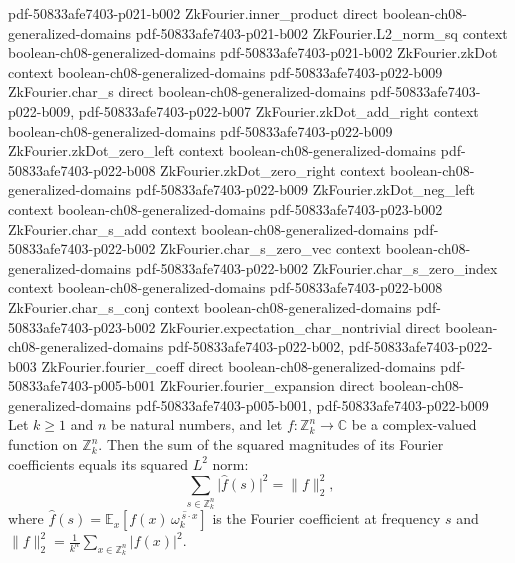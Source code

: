 \begin{lemma}
  {pdf-50833afe7403-p021-b002}
\proofstep
  {ZkFourier.inner_product}
  {direct}
  {boolean-ch08-generalized-domains}
  {pdf-50833afe7403-p021-b002}
\proofstep
  {ZkFourier.L2_norm_sq}
  {context}
  {boolean-ch08-generalized-domains}
  {pdf-50833afe7403-p021-b002}
\proofstep
  {ZkFourier.zkDot}
  {context}
  {boolean-ch08-generalized-domains}
  {pdf-50833afe7403-p022-b009}
\proofstep
  {ZkFourier.char_s}
  {direct}
  {boolean-ch08-generalized-domains}
  {pdf-50833afe7403-p022-b009,
    pdf-50833afe7403-p022-b007}
\proofstep
  {ZkFourier.zkDot_add_right}
  {context}
  {boolean-ch08-generalized-domains}
  {pdf-50833afe7403-p022-b009}
\proofstep
  {ZkFourier.zkDot_zero_left}
  {context}
  {boolean-ch08-generalized-domains}
  {pdf-50833afe7403-p022-b008}
\proofstep
  {ZkFourier.zkDot_zero_right}
  {context}
  {boolean-ch08-generalized-domains}
  {pdf-50833afe7403-p022-b009}
\proofstep
  {ZkFourier.zkDot_neg_left}
  {context}
  {boolean-ch08-generalized-domains}
  {pdf-50833afe7403-p023-b002}
\proofstep
  {ZkFourier.char_s_add}
  {context}
  {boolean-ch08-generalized-domains}
  {pdf-50833afe7403-p022-b002}
\proofstep
  {ZkFourier.char_s_zero_vec}
  {context}
  {boolean-ch08-generalized-domains}
  {pdf-50833afe7403-p022-b002}
\proofstep
  {ZkFourier.char_s_zero_index}
  {context}
  {boolean-ch08-generalized-domains}
  {pdf-50833afe7403-p022-b008}
\proofstep
  {ZkFourier.char_s_conj}
  {context}
  {boolean-ch08-generalized-domains}
  {pdf-50833afe7403-p023-b002}
\proofstep
  {ZkFourier.expectation_char_nontrivial}
  {direct}
  {boolean-ch08-generalized-domains}
  {pdf-50833afe7403-p022-b002,
    pdf-50833afe7403-p022-b003}
\proofstep
  {ZkFourier.fourier_coeff}
  {direct}
  {boolean-ch08-generalized-domains}
  {pdf-50833afe7403-p005-b001}
\proofstep
  {ZkFourier.fourier_expansion}
  {direct}
  {boolean-ch08-generalized-domains}
  {pdf-50833afe7403-p005-b001,
    pdf-50833afe7403-p022-b009}
Let $k \ge 1$ and $n$ be natural numbers, and let $f : \mathbb{Z}_k^n \to \mathbb{C}$ be
a complex-valued function on $\mathbb{Z}_k^n$. Then the sum of the squared magnitudes of
its Fourier coefficients equals its squared $L^2$ norm:
\[
  \sum_{s \in \mathbb{Z}_k^n} \bigl|\hat{f}(s)\bigr|^2 = \|f\|_2^2,
\]
where $\hat{f}(s) = \mathbb{E}_{x}\!\left[f(x)\,\overline{\omega_k^{\,s \cdot
x}}\right]$ is the Fourier coefficient at frequency $s$ and $\|f\|_2^2 =
\tfrac{1}{k^n}\sum_{x \in \mathbb{Z}_k^n} |f(x)|^2$.
\end{lemma}

